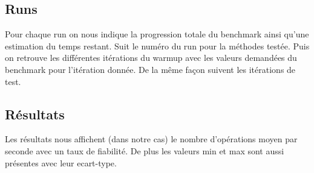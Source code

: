\documentclass{report}
\begin{document}
			\subsection{Runs}
				Pour chaque run on nous indique la progression totale du benchmark ainsi qu'une estimation du temps restant.
				Suit le numéro du run pour la méthodes testée.
				Puis on retrouve les différentes itérations du warmup avec les valeurs demandées du benchmark pour l'itération donnée.
				De la même façon suivent les itérations de test.
			
			\subsection{Résultats}
				Les résultats nous affichent (dans notre cas) le nombre d'opérations moyen par seconde avec un taux de fiabilité.
				De plus les valeurs min et max sont aussi présentes avec leur ecart-type.
			
\end{document}
